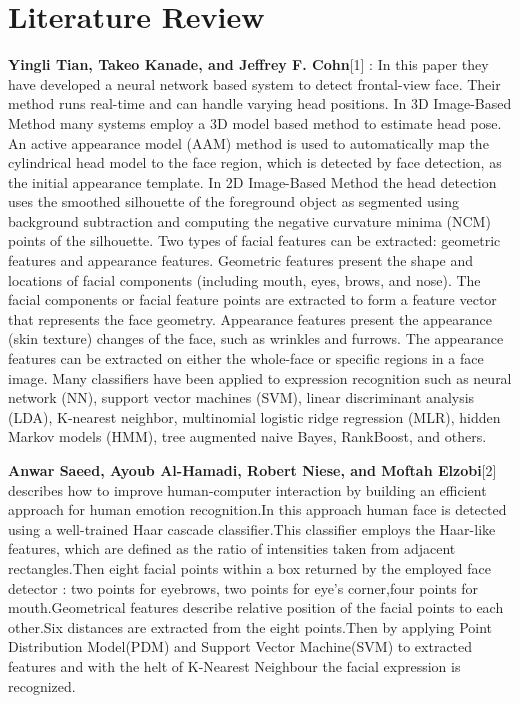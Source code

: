 \documentclass[journal]{IEEEtran}
\begin{document}
\section{Literature Review}

\textbf{Yingli Tian, Takeo Kanade, and Jeffrey F. Cohn}[1] : In this paper they have developed a neural network based system to detect frontal-view face. Their method runs real-time and can handle varying head positions. In 3D Image-Based Method many systems employ a 3D model based method to estimate head pose. An active appearance model (AAM) method is used to automatically map the cylindrical head model to the face region, which is detected by face detection, as the initial appearance template. In 2D Image-Based Method the head detection uses the smoothed silhouette of the foreground object as segmented using background subtraction and computing the negative curvature minima (NCM) points of the silhouette.
 Two types of facial features can be extracted: geometric features and appearance features. Geometric features present the shape and locations of facial components (including mouth, eyes, brows, and nose). The facial components or facial feature points are extracted to form a feature vector that represents the face geometry. Appearance features present the appearance (skin texture) changes of the face, such as wrinkles and furrows. The appearance features can be extracted on either the whole-face or specific regions in a face image. Many classifiers have been applied to expression recognition such as neural network (NN), support vector machines (SVM), linear discriminant analysis (LDA), K-nearest neighbor, multinomial logistic ridge regression (MLR), hidden Markov models (HMM), tree augmented naive Bayes, RankBoost, and others. 

\vspace{3mm}

\textbf{Anwar Saeed, Ayoub Al-Hamadi, Robert Niese, and Moftah Elzobi}[2] describes how to improve human-computer interaction by building an efficient approach for human emotion recognition.In this approach human face is detected using a well-trained Haar cascade classifier.This classifier employs the Haar-like features, which are defined as the ratio of intensities taken from adjacent rectangles.Then eight facial points within a box returned by the employed face detector :  two points for eyebrows, two points for eye’s corner,four points for mouth.Geometrical features describe relative position of the facial points to each other.Six distances are extracted from the eight points.Then by applying Point Distribution Model(PDM) and Support Vector Machine(SVM) to extracted features and with the helt of K-Nearest Neighbour the facial expression is recognized.
\end{document}
